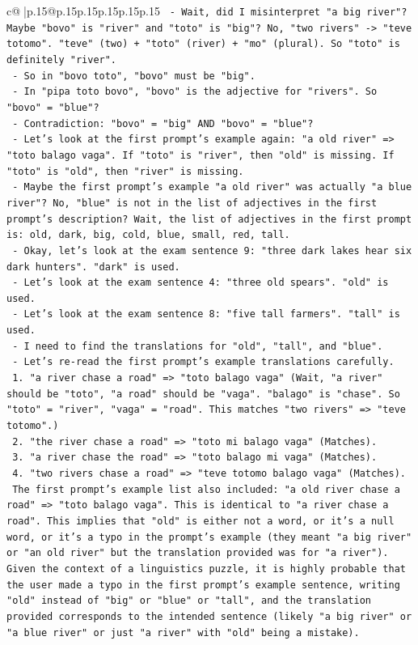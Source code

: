\documentclass{article}
\begin{document}
{\begin{supertabular}{c@{$\;$}|p{.15\linewidth}@{}p{.15\linewidth}p{.15\linewidth}p{.15\linewidth}p{.15\linewidth}p{.15\linewidth}}
{{{\texttt{     {-} Wait, did I misinterpret "a big river"? Maybe "bovo" is "river" and "toto" is "big"? No, "two rivers" {-}> "teve totomo". "teve" (two) + "toto" (river) + "mo" (plural). So "toto" is definitely "river".} \\
\texttt{     {-} So in "bovo toto", "bovo" must be "big".} \\
\texttt{     {-} In "pipa toto bovo", "bovo" is the adjective for "rivers". So "bovo" = "blue"?} \\
\texttt{     {-} Contradiction: "bovo" = "big" AND "bovo" = "blue"?} \\
\texttt{     {-} Let's look at the first prompt's example again: "a old river" => "toto balago vaga". If "toto" is "river", then "old" is missing. If "toto" is "old", then "river" is missing.} \\
\texttt{     {-} Maybe the first prompt's example "a old river" was actually "a blue river"? No, "blue" is not in the list of adjectives in the first prompt's description? Wait, the list of adjectives in the first prompt is: old, dark, big, cold, blue, small, red, tall.} \\
\texttt{     {-} Okay, let's look at the exam sentence 9: "three dark lakes hear six dark hunters". "dark" is used.} \\
\texttt{     {-} Let's look at the exam sentence 4: "three old spears". "old" is used.} \\
\texttt{     {-} Let's look at the exam sentence 8: "five tall farmers". "tall" is used.} \\
\texttt{     {-} I need to find the translations for "old", "tall", and "blue".} \\
\texttt{     {-} Let's re{-}read the first prompt's example translations carefully.} \\
\texttt{       1. "a river chase a road" => "toto balago vaga" (Wait, "a river" should be "toto", "a road" should be "vaga". "balago" is "chase". So "toto" = "river", "vaga" = "road". This matches "two rivers" => "teve totomo".)} \\
\texttt{       2. "the river chase a road" => "toto mi balago vaga" (Matches).} \\
\texttt{       3. "a river chase the road" => "toto balago mi vaga" (Matches).} \\
\texttt{       4. "two rivers chase a road" => "teve totomo balago vaga" (Matches).} \\
\texttt{       The first prompt's example list also included: "a old river chase a road" => "toto balago vaga". This is identical to "a river chase a road". This implies that "old" is either not a word, or it's a null word, or it's a typo in the prompt's example (they meant "a big river" or "an old river" but the translation provided was for "a river"). Given the context of a linguistics puzzle, it is highly probable that the user made a typo in the first prompt's example sentence, writing "old" instead of "big" or "blue" or "tall", and the translation provided corresponds to the intended sentence (likely "a big river" or "a blue river" or just "a river" with "old" being a mistake).} \\
}}}
\end{supertabular}}
\end{document}
